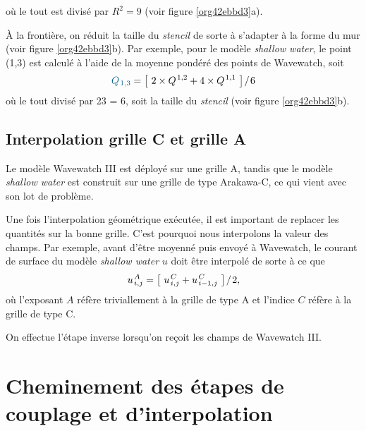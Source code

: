 \documentclass[10pt]{report}
\numberwithin{equation}{section}
\newcommand{\pt}{\hspace{1pt}} %
\begin{document}
où le tout est divisé par \(R^2 = 9\) (voir figure \ref{org42ebbd3}a).\bigskip

À la frontière, on réduit la taille du \emph{stencil} de sorte à s'adapter à la forme du mur (voir figure \ref{org42ebbd3}b).
Par exemple, pour le modèle \emph{shallow water}, le point (1,3) est calculé à l'aide de la moyenne pondéré des points de Wavewatch, soit
\begin{equation}
\label{eq:orgf84c205}
   {\color{MidnightBlue} Q_{\pt1,3}} = \qty[\ 2\times Q^{\pt1,2} + 4\times Q^{\pt1,1}\ ]\pt/\pt6
\end{equation}
où le tout divisé par 2\texttimes{}3 = 6, soit la taille du \emph{stencil} (voir figure \ref{org42ebbd3}b).
\subsection{Interpolation grille C et grille A}
\label{sec:orgcea0cc8}

Le modèle Wavewatch III est déployé sur une grille A, tandis que le modèle \emph{shallow water} est construit sur une grille de type Arakawa-C, ce qui vient avec son lot de problème.\bigskip

Une fois l'interpolation géométrique exécutée, il est important de replacer les quantités sur la bonne grille.
C'est pourquoi nous interpolons la valeur des champs.
Par exemple, avant d'être moyenné puis envoyé à Wavewatch, le courant de surface du modèle \emph{shallow water} \(u\) doit être interpolé de sorte à ce que
\begin{equation}
\label{eq:orgc330cfd}
   u^{\pt A}_{\pt i,j} = \qty[\ u^{\pt C}_{\pt i,j} + u^{\pt C}_{\pt i-1,j}\ ]\pt/\pt2,
\end{equation}
où l'exposant \(A\) réfère triviallement à la grille de type A et l'indice \(C\) réfère à la grille de type C.\bigskip

On effectue l'étape inverse lorsqu'on reçoit les champs de Wavewatch III.
\section{Cheminement des étapes de couplage et d'interpolation}
\label{sec:org98f9457}
\end{document}
